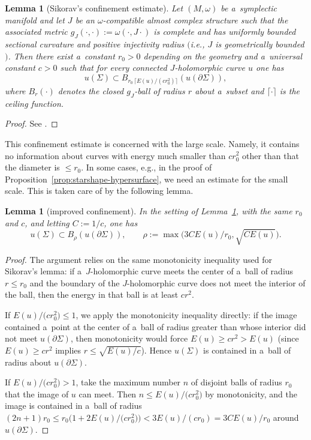 \documentclass[10pt,a4paper]{amsart}
\numberwithin{equation}{section}
\newtheorem{lm}[Theorem]{Lemma}
\theoremstyle{definition}
\begin{document}
\begin{lm}[Sikorav's confinement estimate]\label{lem:sikorav}
 Let $(M,\omega)$ be a~symplectic manifold and let $J$ be an $\omega$-compatible almost complex structure such that the associated metric $g_J(\cdot,\cdot):=\omega(\cdot,J\cdot)$ is complete and has uniformly bounded sectional curvature and positive injectivity radius $($i.e., $J$ is geometrically bounded$)$.
 Then there exist a~constant $r_0>0$ depending on the geometry and a~universal constant $c>0$ such that for every connected $J$-holomorphic curve $u$ one has
 \[
 u(\Sigma)\subset B_{r_0\,\lceil E(u)/(c r_0^2)\rceil}(u(\partial\Sigma)),
 \]
 where $B_{r}(\cdot)$ denotes the closed $g_J$-ball of radius $r$ about a~subset and $\lceil\cdot\rceil$ is the ceiling function.
 \end{lm}
 \begin{proof}
 See \cite[Proposition 4.4.1]{Sikorav}.
 \end{proof}
 This confinement estimate is concerned with the large scale. Namely, it contains no information about curves with energy much smaller than $cr_0^2$ other than that the diameter is $\leq r_0$. In some cases, e.g., in the proof of Proposition~\ref{prop:starshape-hypersurface}, we need an estimate for the small scale. This is taken care of by the following lemma.
 \begin{lm}[improved confinement]\label{lem:sikorav-improved}
 In the setting of Lemma~{\rm\ref{lem:sikorav}}, with the same $r_0$ and $c$, and letting $C := 1/c$, one has
 \[
 u(\Sigma)\subset B_{\rho}(u(\partial\Sigma)),\qquad \rho:=\max\bigl(3CE(u)/r_0,\sqrt{CE(u)}\bigr).
 \]
 \end{lm}
 \begin{proof}
 The argument relies on the same monotonicity inequality used for Sikorav's lemma: if a~$J$-holomorphic curve meets the center of a~ball of radius $r\le r_0$ and the boundary of the $J$-holomorphic curve does not meet the interior of the ball, then the energy in that ball is at least $c r^2$.

 If $E(u)/\bigl(c r_0^2\bigr)\le 1$, we apply the monotonicity inequality directly: if the image contained a~point at the center of a~ball of radius greater than  whose interior did not meet $u(\partial\Sigma)$, then monotonicity would force $E(u)\ge c r^2>E(u)$ (since $E(u)\ge c r^2$ implies $r\le\sqrt{E(u)/c}$). Hence $u(\Sigma)$ is contained in a~ball of radius  about $u(\partial\Sigma)$.

 If $E(u)/\bigl(c r_0^2\bigr)>1$, take the maximum number $n$ of disjoint balls of radius $r_0$ that the image of $u$ can meet. Then $n\le E(u)/\bigl(c r_0^2\bigr)$ by monotonicity, and the image is contained in a~ball of radius $(2n+1)r_0\le r_0\bigl(1+2E(u)/\bigl(c r_0^2\bigr)\bigr)<3E(u)/(cr_0) = 3CE(u)/r_0$ around $u(\partial\Sigma)$.
 \end{proof}
\end{document}
